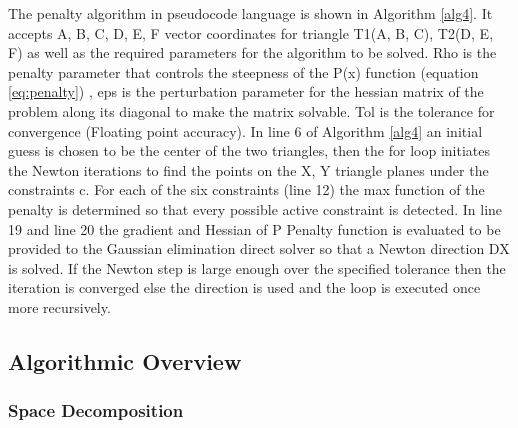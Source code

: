 \documentclass[times,12pt]{article}
\begin{document}
The penalty algorithm in pseudocode language is shown in Algorithm \ref{alg4}. It accepts A, B, C, D, E, F vector coordinates for triangle T1(A, B, C), T2(D, E, F) as well as the required parameters for the algorithm to be solved. Rho is the penalty parameter that controls the steepness of the P(x) function (equation \ref{eq:penalty}) , eps is the perturbation parameter for the hessian matrix of the problem along its diagonal to make the matrix solvable. Tol is the tolerance for convergence (Floating point accuracy). In line 6 of Algorithm \ref{alg4} an initial guess is chosen to be the center of the two triangles, then the for loop initiates the Newton iterations to find the points on the X, Y triangle planes under the constraints c. For each of the six constraints (line 12) the max function of the penalty is determined so that every possible active constraint is detected. In line 19 and line 20 the gradient and Hessian of P Penalty function is evaluated to be provided to the Gaussian elimination direct solver so that a Newton direction DX is solved. If the Newton step is large enough over the specified tolerance then the iteration is converged else the direction is used and the loop is executed once more recursively.


\subsection{Algorithmic Overview}

\subsubsection{Space Decomposition}
\end{document}
